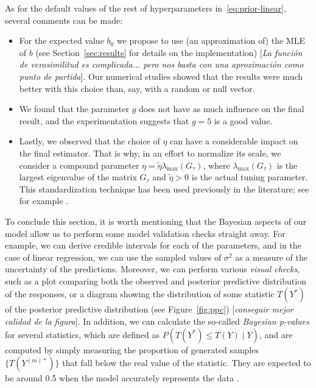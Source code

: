 \documentclass[ba]{imsart}
\numberwithin{equation}{section}
\theoremstyle{plain}
\newcommand\incomment[2][comment-red]{\color{#1}[\textit{#2}]\color{black}}
\begin{document}
As for the default values of the rest of hyperparameters in~\eqref{eq:prior-linear}, several comments can be made:
\begin{itemize}
  \item For the expected value \(b_0\) we propose to use (an approximation of) the MLE of \(b\) (see Section~\ref{sec:results} for details on the implementation) \incomment{La función de verosimilitud es complicada... pero nos basta con una aproximación como punto de partida}. Our numerical studies showed that the results were much better with this choice than, say, with a random or null vector.
  \item We found that the parameter \(g\) does not have as much influence on the final result, and the experimentation suggests that \(g=5\) is a good value.
  \item Lastly, we observed that the choice of \(\eta\) can have a considerable impact on the final estimator. That is why, in an effort to normalize its scale, we consider a compound parameter \(\eta = \tilde \eta \lambda_{\max}(G_\tau)\), where \(\lambda_{\max}(G_\tau)\) is the largest eigenvalue of the matrix \(G_\tau\) and \(\tilde\eta > 0\) is the actual tuning parameter. This standardization technique has been used previously in the literature; see for example \citet{grollemund2019bayesian}.
\end{itemize}

To conclude this section, it is worth mentioning that the Bayesian aspects of our model allow us to perform some model validation checks straight away. For example, we can derive credible intervals for each of the parameters, and in the case of linear regression, we can use the sampled values of \(\sigma^2\) as a measure of the uncertainty of the predictions. Moreover, we can perform various \textit{visual checks}, such as a plot comparing both the observed and posterior predictive distribution of the responses, or a diagram showing the distribution of some statistic \(T(Y^*)\) of the posterior predictive distribution (see Figure~\ref{fig:ppc}) \incomment{conseguir mejor calidad de la figura}. In addition, we can calculate the so-called \textit{Bayesian p-values} for several statistics, which are defined as \(P(T(Y^*)\leq T(Y)\mid Y)\), and are computed by simply measuring the proportion of generated samples \(\{T(Y^{(m)*})\}\) that fall below the real value of the statistic. They are expected to be around 0.5 when the model accurately represents the data \citep[see][Ch.~6]{gelman1995bayesian}.
\end{document}
